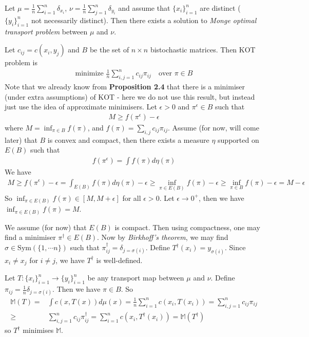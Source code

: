 \documentclass[12pt,a4paper]{article}
\newenvironment{proof}
{\begin{changemargin}{1cm}{0.5cm} 
	}%
	{\end{changemargin}
}
\begin{document}
 Let $\mu = \frac{1}{n} \sum_{i=1}^n \delta_{x_i}$, $\nu = \frac{1}{n} \sum_{j=1}^n \delta_{y_i}$ and assume that $\{x_i \}_{i=1}^n$ are distinct ($\{y_i\}_{i=1}^n$ not necessarily distinct). Then there exists a solution to \emph{Monge optimal transport problem} between $\mu$ and $\nu$. 
\begin{proof}
\pf Let $c_{ij} = c(x_i, y_j)$ and $B$ be the set of $n\times n$ bistochastic matrices. Then KOT problem is
\begin{align*}
\text{minimize } \frac{1}{n} \sum_{i,j=1}^n c_{ij} \pi_{ij} \quad \text{over }\pi\in B
\end{align*}
Note that we already know from \textbf{Proposition 2.4} that there is a minimiser (under extra assumptions) of KOT - here we do not use this result, but instead just use the idea of approximate minimisers. Let $\epsilon >0$ and $\pi^{\epsilon} \in B$ such that
\begin{align*}
M \geq f(\pi^{\epsilon}) - \epsilon
\end{align*}
where $M = \inf_{\pi \in B} f(\pi)$, and $f(\pi) = \sum_{i,j}c_{ij} \pi_{ij}$. Assume (for now, will come later) that $B$ is convex and compact, then there exists a measure $\eta$ supported on $E(B)$ such that
\begin{align*}
f(\pi^{\epsilon}) = \int f(\pi) d\eta(\pi)
\end{align*}
We have
\begin{align*}
M \geq f(\pi^{\epsilon}) - \epsilon =\int_{E(B)} f(\pi) d\eta (\pi)- \epsilon \geq \inf_{\pi \in E(B)} f(\pi) - \epsilon \geq \inf_{\pi \in B} f(\pi) - \epsilon = M -\epsilon
\end{align*}
So $\inf_{\pi \in E(B)} f(\pi) \in [M, M+ \epsilon]$ for all $\epsilon >0$. Let $\epsilon \rightarrow 0^+$, then we have $\inf_{\pi \in E(B)} f(\pi) = M$.

\quad We assume (for now) that $E(B)$ is compact. Then using compactness, one may find a minimiser $\pi^{\dagger} \in E(B)$.
Now by \emph{Birkhoff's theorem}, we may find $\sigma \in \text{Sym}(\{1, \cdots n\})$ such that $\pi_{ij}^{\dagger} = \delta_{j = \sigma(i)}$. Define $T^{\dagger}(x_i) = y_{\sigma(i)}$. Since $x_i \neq x_j$ for $i\neq j$, we have $T^{\dagger}$ is well-defined.

\quad Let $T : \{x_i \}_{i=1}^n \rightarrow \{y_i \}_{i=1}^n$ be any transport map between $\mu$ and $\nu$. Define $\pi_{ij} = \frac{1}{n} \delta_{j = \sigma(i)}$. Then we have $\pi \in B$. So
\begin{align*}
\mathbb{M}(T) =& \int c(x, T(x)) d\mu(x) =\frac{1}{n} \sum_{i=1}^n c(x_i, T(x_i)) = \sum_{i,j=1}^n c_{ij}\pi_{ij} \\
\geq& \sum_{i,j=1}^n c_{ij}\pi^{\dagger}_{ij} = \sum_{i=1}^n c(x_i, T^{\dagger}(x_i)) = \mathbb{M}(T^{\dagger})
\end{align*}
so $T^{\dagger}$ minimises $\mathbb{M}$.
\s


\end{proof}
\end{document}
